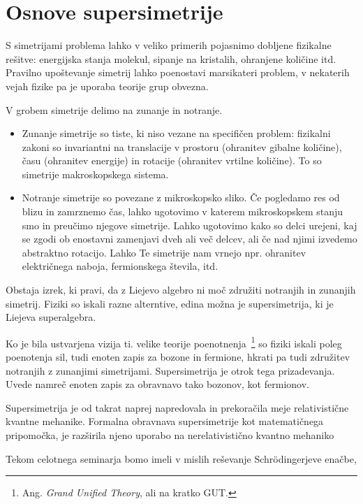 \section{Osnove supersimetrije}

S simetrijami problema lahko v veliko primerih pojasnimo dobljene fizikalne re\v sitve: energijska stanja molekul,
sipanje na kristalih, ohranjene koli\v cine itd. Pravilno upo\v stevanje simetrij lahko poenostavi marsikateri problem,
v nekaterih vejah fizike pa je uporaba teorije grup obvezna.

V grobem simetrije delimo na zunanje in notranje.
\begin{itemize}
	\item{Zunanje simetrije so tiste, ki niso vezane na specifi\v cen problem: fizikalni zakoni so invariantni
		na translacije v prostoru (ohranitev gibalne koli\v cine), \v casu (ohranitev energije) in rotacije
		(ohranitev vrtilne koli\v cine). To so simetrije makroskopskega sistema.}
	\item{Notranje simetrije so povezane z mikroskopsko sliko. \v Ce pogledamo res od blizu in zamrznemo
		\v cas, lahko ugotovimo v katerem mikroskopskem stanju smo in preu\v cimo njegove simetrije. Lahko ugotovimo
		kako so delci urejeni, kaj se zgodi ob enostavni zamenjavi dveh ali ve\v c delcev, ali \v ce nad njimi
		izvedemo abstraktno rotacijo. Lahko Te simetrije nam vrnejo npr. ohranitev elektri\v cnega naboja, fermionskega
		\v stevila, itd.}
\end{itemize}

Obstaja izrek, ki pravi, da z Liejevo algebro ni mo\v c zdru\v ziti notranjih in zunanjih simetrij. Fiziki so iskali razne alterntive,
edina mo\v zna je supersimetrija, ki je Liejeva superalgebra.

\ni Ko je bila ustvarjena vizija ti. velike teorije poenotnenja~\footnote{Ang. \emph{Grand Unified Theory}, ali na kratko GUT.}
so fiziki iskali poleg poenotenja sil, tudi enoten zapis za bozone in fermione, hkrati pa tudi zdru\v zitev notranjih
z zunanjimi simetrijami. Supersimetrija je otrok tega prizadevanja. Uvede namre\v c enoten zapis za obravnavo tako bozonov,
kot fermionov.

Supersimetrija je od takrat naprej napredovala in prekora\v cila meje relativisti\v cne kvantne mehanike. Formalna obravnava
supersimetrije kot matemati\v cnega pripomo\v cka, je raz\v sirila njeno uporabo na nerelativisti\v cno kvantno mehaniko

Tekom celotnega seminarja bomo imeli v mislih re\v sevanje Schr\" odingerjeve ena\v cbe,

